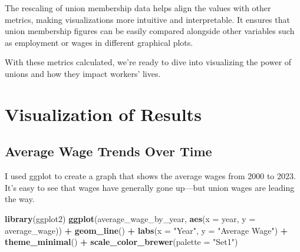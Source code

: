 \documentclass[
]{book}
\newenvironment{Shaded}{\begin{snugshade}}{\end{snugshade}}
\newcommand{\AttributeTok}[1]{\textcolor[rgb]{0.13,0.29,0.53}{#1}}
\newcommand{\DecValTok}[1]{\textcolor[rgb]{0.00,0.00,0.81}{#1}}
\newcommand{\FunctionTok}[1]{\textcolor[rgb]{0.13,0.29,0.53}{\textbf{#1}}}
\newcommand{\NormalTok}[1]{#1}
\newcommand{\OtherTok}[1]{\textcolor[rgb]{0.56,0.35,0.01}{#1}}
\newcommand{\SpecialCharTok}[1]{\textcolor[rgb]{0.81,0.36,0.00}{\textbf{#1}}}
\newcommand{\StringTok}[1]{\textcolor[rgb]{0.31,0.60,0.02}{#1}}
\theoremstyle{definition}
\theoremstyle{definition}
\theoremstyle{definition}
\theoremstyle{definition}
\theoremstyle{remark}
\begin{document}
\begin{Shaded}
\end{Shaded}

The rescaling of union membership data helps align the values with other metrics, making visualizations more intuitive and interpretable. It ensures that union membership figures can be easily compared alongside other variables such as employment or wages in different graphical plots.

With these metrics calculated, we're ready to dive into visualizing the power of unions and how they impact workers' lives.

\section{Visualization of Results}\label{visualization-of-results}

\subsection{Average Wage Trends Over Time}\label{average-wage-trends-over-time}

I used ggplot to create a graph that shows the average wages from 2000 to 2023. It's easy to see that wages have generally gone up---but union wages are leading the way.

\begin{Shaded}
\begin{Highlighting}[]
\FunctionTok{library}\NormalTok{(ggplot2)}
\FunctionTok{ggplot}\NormalTok{(average\_wage\_by\_year, }\FunctionTok{aes}\NormalTok{(}\AttributeTok{x =}\NormalTok{ year, }\AttributeTok{y =}\NormalTok{ average\_wage)) }\SpecialCharTok{+}
  \FunctionTok{geom\_line}\NormalTok{() }\SpecialCharTok{+} 
  \FunctionTok{labs}\NormalTok{(}\AttributeTok{x =} \StringTok{"Year"}\NormalTok{, }\AttributeTok{y =} \StringTok{"Average Wage"}\NormalTok{) }\SpecialCharTok{+}
  \FunctionTok{theme\_minimal}\NormalTok{() }\SpecialCharTok{+}
  \FunctionTok{scale\_color\_brewer}\NormalTok{(}\AttributeTok{palette =} \StringTok{"Set1"}\NormalTok{)}
\end{Highlighting}
\end{Shaded}
\end{document}
